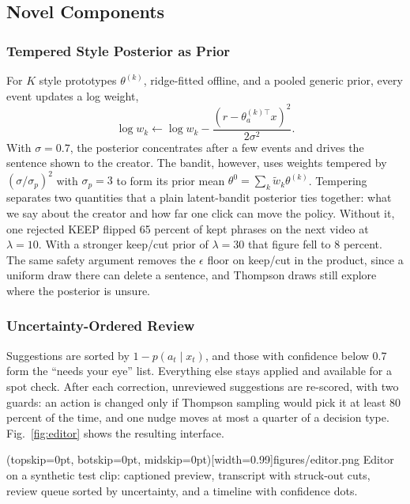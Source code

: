 \documentclass{ieeeaccess}
\begin{document}
\subsection{Novel Components}

\subsubsection{Tempered Style Posterior as Prior}
For $K$ style prototypes $\theta^{(k)}$, ridge-fitted offline, and a pooled generic prior, every event updates a log weight,
\begin{equation}
\log w_k \leftarrow \log w_k - \frac{\left(r - \theta^{(k)\top}_{a} x\right)^{2}}{2\sigma^{2}}. \label{eq:style}
\end{equation}
With $\sigma=0.7$, the posterior concentrates after a few events and drives the sentence shown to the creator. The bandit, however, uses weights tempered by $(\sigma/\sigma_p)^{2}$ with $\sigma_p=3$ to form its prior mean $\theta^{0}=\sum_k \tilde w_k \theta^{(k)}$. Tempering separates two quantities that a plain latent-bandit posterior ties together: what we say about the creator and how far one click can move the policy. Without it, one rejected KEEP flipped 65 percent of kept phrases on the next video at $\lambda=10$. With a stronger keep/cut prior of $\lambda=30$ that figure fell to 8 percent. The same safety argument removes the $\epsilon$ floor on keep/cut in the product, since a uniform draw there can delete a sentence, and Thompson draws still explore where the posterior is unsure.

\subsubsection{Uncertainty-Ordered Review}
Suggestions are sorted by $1-p(a_t\mid x_t)$, and those with confidence below 0.7 form the ``needs your eye'' list. Everything else stays applied and available for a spot check. After each correction, unreviewed suggestions are re-scored, with two guards: an action is changed only if Thompson sampling would pick it at least 80 percent of the time, and one nudge moves at most a quarter of a decision type. Fig.~\ref{fig:editor} shows the resulting interface.

\Figure[t!](topskip=0pt, botskip=0pt, midskip=0pt)[width=0.99\columnwidth]{figures/editor.png}
{Editor on a synthetic test clip: captioned preview, transcript with struck-out cuts, review queue sorted by uncertainty, and a timeline with confidence dots.\label{fig:editor}}
\end{document}
